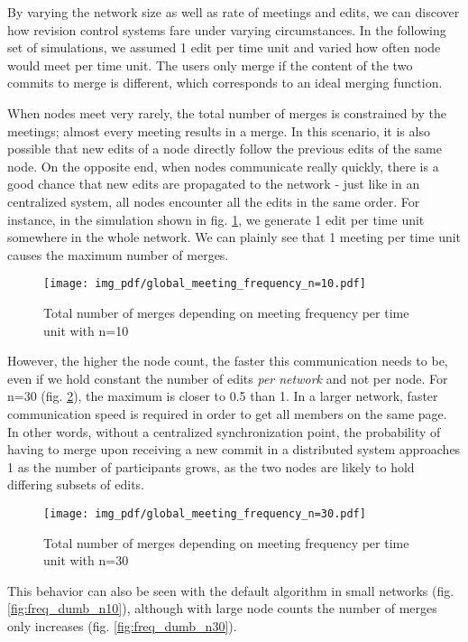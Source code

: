 \documentclass[letterpaper,conference]{IEEEtran}
\begin{document}
By varying the network size as well as rate of meetings and edits, we can discover how revision control systems fare under varying circumstances. In the following set of simulations, we assumed 1 edit per time unit and varied how often node would meet per time unit. The users only merge if the content of the two commits to merge is different, which corresponds to an ideal merging function.

When nodes meet very rarely, the total number of merges is constrained by the meetings; almost every meeting results in a merge. In this scenario, it is also possible that new edits of a node directly follow the previous edits of the same node. On the opposite end, when nodes communicate really quickly, there is a good chance that new edits are propagated to the network - just like in an centralized system, all nodes encounter all the edits in the same order. For instance, in the simulation shown in fig. \ref{fig:freq_n10}, we generate 1 edit per time unit somewhere in the whole network. We can plainly see that 1 meeting per time unit causes the maximum number of merges.

\begin{figure}
  \texttt{[image: img\_pdf/global\_meeting\_frequency\_n=10.pdf]}
  \caption{Total number of merges depending on meeting frequency per time unit with n=10}
  \label{fig:freq_n10}
\end{figure}

However, the higher the node count, the faster this communication needs to be, even if we hold constant the number of edits \textit{per network} and not per node. For n=30 (fig. \ref{fig:freq_n30}), the maximum is closer to 0.5 than 1. In a larger network, faster communication speed is required in order to get all members on the same page. In other words, without a centralized synchronization point, the probability of having to merge upon receiving a new commit in a distributed system approaches 1 as the number of participants grows, as the two nodes are likely to hold differing subsets of edits.
\begin{figure}
  \texttt{[image: img\_pdf/global\_meeting\_frequency\_n=30.pdf]}
  \caption{Total number of merges depending on meeting frequency per time unit with n=30}
  \label{fig:freq_n30}
\end{figure}

This behavior can also be seen with the default algorithm in small networks (fig. \ref{fig:freq_dumb_n10}), although with large node counts the number of merges only increases (fig. \ref{fig:freq_dumb_n30}).
\end{document}
